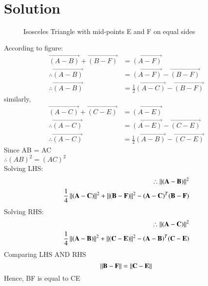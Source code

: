 \documentclass[journal,12pt,twocolumn]{IEEEtran}
\begin{document}
 \section{Solution}
\renewcommand{\thefigure}{1}
\renewcommand{\thefigure}{1}
\begin{figure}[!h]
\centering
\resizebox{\columnwidth}{!}{}
\caption{Isosceles Triangle with mid-points E and F on equal sides}
\label{myfig}
\end{figure}
According to figure:
\begin{align}
\vec{(A-B)}+\vec{(B-F)} &= \vec{(A-F)}\\
\therefore \vec{(A-B)} &= \vec{(A-F)}-\vec{(B-F)}\\
\therefore \vec{(A-B)} &= \frac{1}{2}\vec{(A-C)}-\vec{(B-F)}
\end{align}
similarly,
\begin{align}
\vec{(A-C)}+\vec{(C-E)} &= \vec{(A-E)}\\
\therefore \vec{(A-C)} &= \vec{(A-E)}-\vec{(C-E)}\\
\therefore \vec{(A-C)} &= \frac{1}{2}\vec{(A-B)}-\vec{(C-E)}
\end{align}
Since AB = AC\\
$\therefore (AB)^2 = (AC)^2$\\
Solving LHS:
\begin{align}
\therefore \left\lVert\mathbf{(A-B)}\right\rVert^2\\
\frac{1}{4}\left\lVert\mathbf{(A-C)}\right\rVert^2+\left\lVert\mathbf{(B-F)}\right\rVert^2-(\mathbf{A-C})^T(\mathbf{B-F})
\end{align}
Solving RHS:
\begin{align}
\therefore \left\lVert\mathbf{(A-C)}\right\rVert^2\\
\frac{1}{4}\left\lVert\mathbf{(A-B)}\right\rVert^2+\left\lVert\mathbf{(C-E)}\right\rVert^2-(\mathbf{A-B})^T(\mathbf{C-E})
\end{align}
Comparing LHS AND RHS
$$\left\lVert\mathbf{B-F}\right\rVert = \left\lVert\mathbf{C-E}\right\rVert$$
Hence, BF is equal to CE
 
\end{document}
